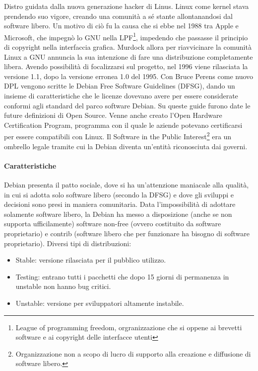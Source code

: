 Distro guidata dalla nuova generazione hacker di Linus. Linux come kernel stava prendendo suo vigore, creando una comunit\`a a sé stante allontanandosi dal software libero. Un motivo di ci\`o fu la causa che si ebbe nel 1988 tra Apple e Microsoft, che impegn\`o lo GNU nella LPF\footnote{League of programming freedom, orgranizzazione che si oppene ai brevetti software e ai copyright delle interfacce utenti}, impedendo che passasse il principio di copyright nella interfaccia grafica. Murdock allora per riavvicinare la comunit\`a Linux a GNU annuncia la sua intenzione di fare una distribuzione completamente libera. Avendo possibilit\`a di focalizzarsi sul progetto, nel 1996 viene rilasciata la versione 1.1, dopo la versione erronea 1.0 del 1995. Con Bruce Perens come nuovo DPL vengono scritte le Debian Free Software Guidelines (DFSG), dando un insieme di caratteristiche che le licenze dovevano avere per essere considerate conformi agli standard del parco software Debian. Su queste guide furono date le future definizioni di Open Source. Venne anche creato l'Open Hardware Certification Program, programma con il quale le aziende potevano certificarsi per essere compatibili con Linux. Il Software in the Public Interest\footnote{Organizzazione non a scopo di lucro di supporto alla creazione e diffusione di software libero.} era un ombrello legale tramite cui la Debian diventa un'entit\`a riconosciuta dai governi.

\paragraph*{Caratteristiche} Debian presenta il patto sociale, dove si ha un'attenzione maniacale alla qualit\`a, in cui si adotta solo software libero (secondo la DFSG) e dove gli sviluppi e decisioni sono presi in maniera comunitaria. Data l'impossibilit\`a di adottare solamente software libero, la Debian ha messo a disposizione (anche se non supporta ufficilamente) software non-free (ovvero costituito da software proprietario) e contrib (software libero che per funzionare ha bisogno di software proprietario). Diversi tipi di distribuzioni:
\begin{itemize}
  
\item Stable: versione rilasciata per il pubblico utilizzo.
\item Testing: entrano tutti i pacchetti che dopo 15 giorni di permanenza in unstable non hanno bug critici.
\item Unstable: versione per sviluppatori altamente instabile.

\end{itemize}

